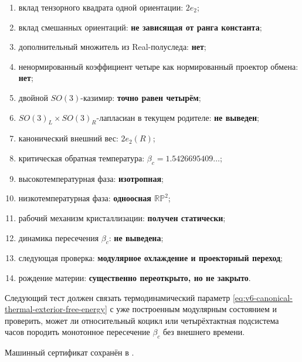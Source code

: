 \begin{protocol}
\begin{enumerate}
 \item вклад тензорного квадрата одной ориентации:
 \textbf{$2e_2$};
 \item вклад смешанных ориентаций: \textbf{не зависящая от ранга константа};
 \item дополнительный множитель из Real-полуследа: \textbf{нет};
 \item ненормированный коэффициент четыре как нормированный проектор обмена:
 \textbf{нет};
 \item двойной $SO(3)$-казимир: \textbf{точно равен четырём};
 \item $SO(3)_L\times SO(3)_R$-лапласиан в текущем родителе:
 \textbf{не выведен};
 \item канонический внешний вес: \textbf{$2e_2(R)$};
 \item критическая обратная температура:
 \textbf{$\beta_c=1.5426695409\ldots$};
 \item высокотемпературная фаза: \textbf{изотропная};
 \item низкотемпературная фаза: \textbf{одноосная $\mathbb{RP}^2$};
 \item рабочий механизм кристаллизации: \textbf{получен статически};
 \item динамика пересечения $\beta_c$: \textbf{не выведена};
 \item следующая проверка: \textbf{модулярное охлаждение и проекторный переход};
 \item рождение материи: \textbf{существенно переоткрыто, но не закрыто}.
\end{enumerate}
\end{protocol}

Следующий тест должен связать термодинамический параметр
\eqref{eq:v6-canonical-thermal-exterior-free-energy} с уже построенным
модулярным состоянием и проверить, может ли относительный коцикл или
четырёхтактная подсистема часов породить монотонное пересечение
$\beta_c$ без внешнего времени.

Машинный сертификат сохранён в
.